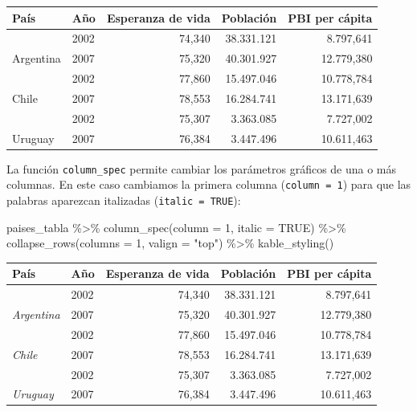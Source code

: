 \documentclass[
  openany]{book}
\newenvironment{Shaded}{\begin{snugshade}}{\end{snugshade}}
\newcommand{\AttributeTok}[1]{\textcolor[rgb]{0.77,0.63,0.00}{#1}}
\newcommand{\ConstantTok}[1]{\textcolor[rgb]{0.00,0.00,0.00}{#1}}
\newcommand{\DecValTok}[1]{\textcolor[rgb]{0.00,0.00,0.81}{#1}}
\newcommand{\FunctionTok}[1]{\textcolor[rgb]{0.00,0.00,0.00}{#1}}
\newcommand{\NormalTok}[1]{#1}
\newcommand{\SpecialCharTok}[1]{\textcolor[rgb]{0.00,0.00,0.00}{#1}}
\newcommand{\StringTok}[1]{\textcolor[rgb]{0.31,0.60,0.02}{#1}}
\begin{document}
\begin{table}
\centering
\begin{tabular}{l|l|r|r|r}
\hline
País & Año & Esperanza de vida & Población & PBI per cápita\\
\hline
 & 2002 & 74,340 & 38.331.121 & 8.797,641\\
\cline{2-5}
\multirow[t]{-2}{*}{\raggedright\arraybackslash Argentina} & 2007 & 75,320 & 40.301.927 & 12.779,380\\
\cline{1-5}
 & 2002 & 77,860 & 15.497.046 & 10.778,784\\
\cline{2-5}
\multirow[t]{-2}{*}{\raggedright\arraybackslash Chile} & 2007 & 78,553 & 16.284.741 & 13.171,639\\
\cline{1-5}
 & 2002 & 75,307 & 3.363.085 & 7.727,002\\
\cline{2-5}
\multirow[t]{-2}{*}{\raggedright\arraybackslash Uruguay} & 2007 & 76,384 & 3.447.496 & 10.611,463\\
\hline
\end{tabular}
\end{table}

La función \texttt{column\_spec} permite cambiar los parámetros gráficos de una o más columnas.
En este caso cambiamos la primera columna (\texttt{column\ =\ 1}) para que las palabras aparezcan italizadas (\texttt{italic\ =\ TRUE}):

\begin{Shaded}
\begin{Highlighting}[]
\NormalTok{paises\_tabla }\SpecialCharTok{\%\textgreater{}\%} 
  \FunctionTok{column\_spec}\NormalTok{(}\AttributeTok{column =} \DecValTok{1}\NormalTok{, }\AttributeTok{italic =} \ConstantTok{TRUE}\NormalTok{) }\SpecialCharTok{\%\textgreater{}\%}
  \FunctionTok{collapse\_rows}\NormalTok{(}\AttributeTok{columns =} \DecValTok{1}\NormalTok{, }\AttributeTok{valign =} \StringTok{"top"}\NormalTok{)  }\SpecialCharTok{\%\textgreater{}\%}
  \FunctionTok{kable\_styling}\NormalTok{() }
\end{Highlighting}
\end{Shaded}

\begin{table}
\centering
\begin{tabular}{>{}l|l|r|r|r}
\hline
País & Año & Esperanza de vida & Población & PBI per cápita\\
\hline
 & 2002 & 74,340 & 38.331.121 & 8.797,641\\
\cline{2-5}
\multirow[t]{-2}{*}{\raggedright\arraybackslash \em{Argentina}} & 2007 & 75,320 & 40.301.927 & 12.779,380\\
\cline{1-5}
 & 2002 & 77,860 & 15.497.046 & 10.778,784\\
\cline{2-5}
\multirow[t]{-2}{*}{\raggedright\arraybackslash \em{Chile}} & 2007 & 78,553 & 16.284.741 & 13.171,639\\
\cline{1-5}
 & 2002 & 75,307 & 3.363.085 & 7.727,002\\
\cline{2-5}
\multirow[t]{-2}{*}{\raggedright\arraybackslash \em{Uruguay}} & 2007 & 76,384 & 3.447.496 & 10.611,463\\
\hline
\end{tabular}
\end{table}
\end{document}
